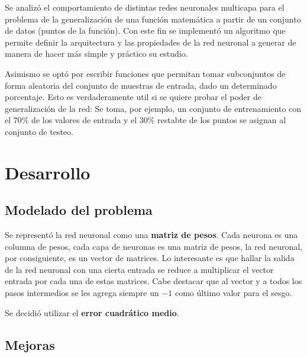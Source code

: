 \documentclass[%
    final,
    reprint,
    notitlepage,
    narroweqnarray,
    inline,
    twoside,
    invited
    ]{ieee}
\begin{document}
\par Se analizó el comportamiento de distintas redes neuronales multicapa para el problema de la generalización de una función matemática a partir de un conjunto de datos (puntos de la función).
Con este fin se implementó un algoritmo que permite definir la arquitectura y las propiedades de la red neuronal a generar de manera de hacer más simple y práctico su estudio. \\
\par Asimismo se optó por escribir funciones que permitan tomar subconjuntos de forma aleatoria del conjunto de muestras de entrada, dado un determinado porcentaje. Esto es verdaderamente util si se quiere probar el poder de generalización de la red: Se toma, por ejemplo, un conjunto de entrenamiento con el $70\%$ de los valores de entrada y el $30\%$ restabte de los puntos se asignan al conjunto de testeo.


\section{Desarrollo}

\subsection{Modelado del problema}

\par Se representó la red neuronal como una \textbf{matriz de pesos}. Cada neurona es una columna de pesos, cada capa de 
neuronas es una matriz de pesos, la red neuronal, por consiguiente, es un vector de matrices. Lo interesante es que hallar 
la salida de la red neuronal con una cierta entrada se reduce a multiplicar el vector entrada por cada una de estas matrices. Cabe destacar 
que al vector y a todos los pasos intermedios se les agrega siempre un $-1$ como último valor para el sesgo.\\

\par Se decidió utilizar el \textbf{error cuadrático medio}.

\subsection{Mejoras}
\end{document}
